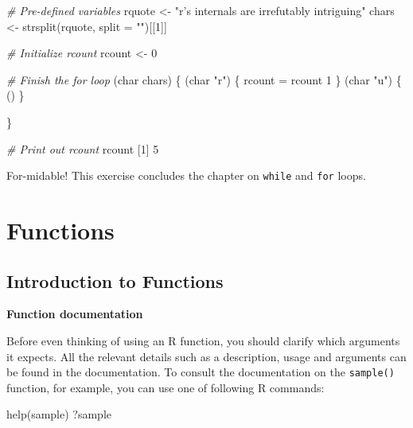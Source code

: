 \documentclass[]{article}
\newcommand{\hlnum}[1]{\textcolor[rgb]{0.816,0.125,0.439}{#1}}%
\newcommand{\hlstr}[1]{\textcolor[rgb]{0.251,0.627,0.251}{#1}}%
\newcommand{\hlcom}[1]{\textcolor[rgb]{0.502,0.502,0.502}{\textit{#1}}}%
\newcommand{\hlstd}[1]{\textcolor[rgb]{0.251,0.251,0.251}{#1}}%
\newcommand{\hlkwc}[1]{\textcolor[rgb]{0.251,0.251,0.251}{#1}}%
\newcommand{\hlkwd}[1]{\textcolor[rgb]{0.878,0.439,0.125}{#1}}%
\newenvironment{Shaded}{\begin{myshaded}}{\end{myshaded}}
\newcommand{\KeywordTok}[1]{\hlkwd{#1}}
\newcommand{\DataTypeTok}[1]{\hlkwc{#1}}
\newcommand{\DecValTok}[1]{\hlnum{#1}}
\newcommand{\StringTok}[1]{\hlstr{#1}}
\newcommand{\CommentTok}[1]{\hlcom{#1}}
\newcommand{\NormalTok}[1]{\hlstd{#1}}
\begin{document}
\begin{Shaded}
\begin{Highlighting}[]
\CommentTok{# Pre-defined variables}
\NormalTok{rquote <-}\StringTok{ "r's internals are irrefutably intriguing"}
\NormalTok{chars <-}\StringTok{ }\KeywordTok{strsplit}\NormalTok{(rquote, }\DataTypeTok{split =} \StringTok{""}\NormalTok{)[[}\DecValTok{1}\NormalTok{]]}

\CommentTok{# Initialize rcount}
\NormalTok{rcount <-}\StringTok{ }\DecValTok{0}

\CommentTok{# Finish the for loop}
\NormalTok{ (char }\NormalTok{ chars) \{}
\NormalTok{(char }\OperatorTok{==}\StringTok{ "r"}\NormalTok{) \{}
\NormalTok{rcount =}\StringTok{ }\NormalTok{rcount }\OperatorTok{+}\StringTok{ }\DecValTok{1}
\NormalTok{\} } \NormalTok{ (char }\OperatorTok{==}\StringTok{ "u"}\NormalTok{) \{}
\NormalTok{()}
\NormalTok{\}}

\NormalTok{\}}

\CommentTok{# Print out rcount}
\NormalTok{rcount}
\NormalTok{   [}\DecValTok{1}\NormalTok{] }\DecValTok{5}
\end{Highlighting}
\end{Shaded}

For-midable! This exercise concludes the chapter on \texttt{while} and
\texttt{for} loops.

\section{Functions}\label{functions}

\subsection{Introduction to Functions}\label{introduction-to-functions}

\textbf{Function documentation}

Before even thinking of using an R function, you should clarify which
arguments it expects. All the relevant details such as a description,
usage and arguments can be found in the documentation. To consult the
documentation on the \texttt{sample()} function, for example, you can
use one of following R commands:

\begin{Shaded}
\begin{Highlighting}[]
\KeywordTok{help}\NormalTok{(sample)}
\NormalTok{?sample}
\end{Highlighting}
\end{Shaded}
\end{document}
